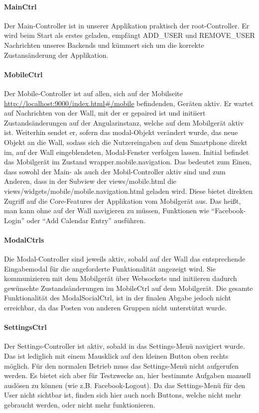 \documentclass[10pt,a4paper]{report}
\newcommand{\code}[1]{{\fontfamily{cmvtt}\selectfont #1}}
\begin{document}
				\paragraph{MainCtrl}
					Der Main-Controller ist in unserer Applikation praktisch der root-Controller. Er wird beim Start als erstes geladen, empfängt \code{ADD\_USER} und \code{REMOVE\_USER} Nachrichten unseres Backends und kümmert sich um die korrekte Zustansänderung der Applikation.
				\paragraph{MobileCtrl}
					Der Mobile-Controller ist auf allen, sich auf der Mobilseite \url{http://localhost:9000/index.html\#/mobile} befindenden, Geräten aktiv. Er wartet auf Nachrichten von der Wall, mit der er gepaired ist und initiiert Zustandsänderungen auf der Angularinstanz, welche auf dem Mobilgerät aktiv ist. Weiterhin sendet er, sofern das \code{modal}-Objekt verändert wurde, das neue Objekt an die Wall, sodass sich die Nutzereingaben auf dem Smartphone direkt im, auf der Wall eingeblendeten, Modal-Fenster verfolgen lassen. Initial befindet das Mobilgerät im Zustand \code{wrapper.mobile.navigation}. Das bedeutet zum Einen, dass sowohl der Main- als auch der Mobil-Controller aktiv sind und zum Anderen, dass in der Subview der \code{views/mobile.html} die \code{views/widgets/mobile/mobile.navigation.html} geladen wird. Diese bietet direkten Zugriff auf die Core-Features der Applikation vom Mobilgerät aus. Das heißt, man kann ohne auf der Wall navigieren zu müssen, Funktionen wie "`Facebook-Login"' oder "`Add Calendar Entry"' ausführen.
				\paragraph{ModalCtrls}
					Die Modal-Controller sind jeweils aktiv, sobald auf der Wall das entsprechende Eingabemodal für die angeforderte Funktionalität angezeigt wird. Sie kommunizieren mit dem Mobilgerät über Websockets und initiieren dadurch gewünschte Zustandsänderungen im MobileCtrl auf dem Mobilgerät. Die gesamte Funktionalität des ModalSocialCtrl, ist in der finalen Abgabe jedoch nicht erreichbar, da das Posten von anderen Gruppen nicht unterstützt wurde.
				\paragraph{SettingsCtrl}
					Der Settings-Controller ist aktiv, sobald in das Settings-Menü navigiert wurde. Das ist lediglich mit einem Mausklick auf den kleinen Button oben rechts möglich. Für den normalen Betrieb muss das Settings-Menü nicht aufgerufen werden. Es bietet sich aber für Testzwecke an, hier bestimmte Aufgaben manuell auslösen zu können (wie z.B. Facebook-Logout). Da das Settings-Menü für den User nicht sichtbar ist, finden sich hier auch noch Buttons, welche nicht mehr gebraucht werden, oder nicht mehr funktionieren.
\end{document}
